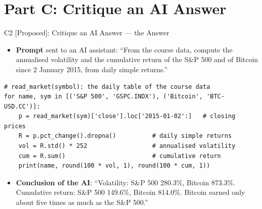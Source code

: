 \section{Part C: Critique an AI Answer}

\begin{frame}[fragile]{C2 [Proposed]: Critique an AI Answer --- the Answer}
\itemsize{\footnotesize}
\begin{itemize}
    \item \textbf{Prompt} sent to an AI assistant: ``From the course data, compute the annualised volatility and the cumulative return of the S\&P 500 and of Bitcoin since 2 January 2015, from daily simple returns.''
\end{itemize}
\begin{lstlisting}
# read_market(symbol): the daily table of the course data
for name, sym in [('S&P 500', 'GSPC.INDX'), ('Bitcoin', 'BTC-USD.CC')]:
    p = read_market(sym)['close'].loc['2015-01-02':]   # closing prices
    R = p.pct_change().dropna()          # daily simple returns
    vol = R.std() * 252                  # annualised volatility
    cum = R.sum()                        # cumulative return
    print(name, round(100 * vol, 1), round(100 * cum, 1))
\end{lstlisting}
\begin{itemize}
    \item \textbf{Conclusion of the AI}: ``Volatility: S\&P 500 280.3\%, Bitcoin 873.3\%. Cumulative return: S\&P 500 149.6\%, Bitcoin 814.0\%. Bitcoin earned only about five times as much as the S\&P 500.''
\end{itemize}
\end{frame}

